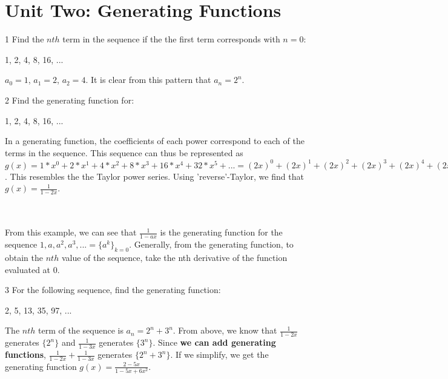 \documentclass[11pt,twosided]{article}
\begin{document}
\section{Unit Two: Generating Functions}
\begin{problem}
    1 Find the $nth$ term in the sequence if the the first term corresponds with $n=0$:
     \begin{center} 1, 2, 4, 8, 16, ...\end{center}
      \end{problem}
\begin{solution}
$a_{0} = 1$, $a_{1} = 2$, $a_{2} = 4$. It is clear from this pattern that $a_{n} = 2^{n}$. 
\end{solution}

\begin{problem}
    2 Find the generating function for:
     \begin{center} 1, 2, 4, 8, 16, ...\end{center}
\end{problem}
\begin{solution}
In a generating function, the coefficients of each power correspond to each of the terms in the sequence. This sequence can thus be represented as $g(x) = 1*x^{0} + 2*x^{1} + 4*x^{2} + 8*x^{3} + 16*x^{4} + 32*x^{5} + ... = (2x)^0 + (2x)^1 + (2x)^2 + (2x)^3 + (2x)^4 + (2x)^5 + ...$. This resembles the the Taylor power series. Using 'reverse'-Taylor, we find that $g(x) = \frac{1}{1-2x}$. 
\end{solution} \\
 

\\From this example, we can see that $\frac{1}{1-ax}$ is the generating function for the sequence $1, a, a^2, a^3, ... = \{a^k\}_{k=0}$. Generally, from the generating function, to obtain the $nth$ value of the sequence, take the nth derivative of the function evaluated at 0.\newline

\begin{problem}
    3 For the following sequence, find the generating function:
    \begin{center} 2, 5, 13, 35, 97, ... \end{center}
\end{problem}

\begin{solution}
The $nth$ term of the sequence is $a_{n} = 2^{n} + 3^{n}$. From above, we know that $\frac{1}{1-2x}$ generates $\{2^n\}$ and $\frac{1}{1-3x}$ generates $\{3^n\}$. Since \textbf{we can add generating functions}, $\frac{1}{1-2x}+\frac{1}{1-3x}$ generates $\{2^n +3^n\}$. If we simplify, we get the generating function $g(x)=\frac{2-5x}{1-5x+6x^2}$.
\end{solution}
\end{document}
